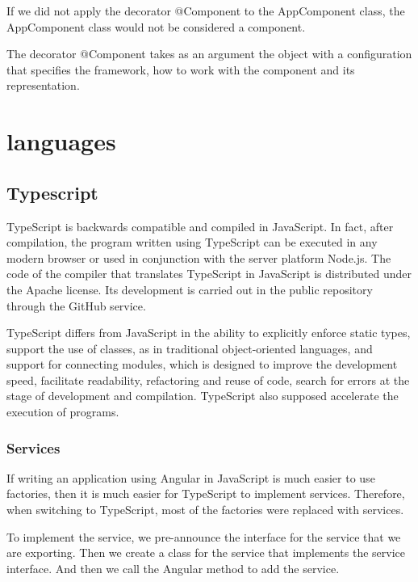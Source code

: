 If we did not apply the decorator @Component to the AppComponent class, the AppComponent class would not be considered a component.

The decorator @Component takes as an argument the object with a configuration that specifies the framework, how to work with the component and its representation. \cite{Angular}



\section{languages}

\subsection{Typescript}
TypeScript is backwards compatible and compiled in JavaScript. In fact, after compilation, the program written using TypeScript can be executed in any modern browser or used in conjunction with the server platform Node.js. The code of the compiler that translates TypeScript in JavaScript is distributed under the Apache license. Its development is carried out in the public repository through the GitHub service.\par
TypeScript differs from JavaScript in the ability to explicitly enforce static types, support the use of classes, as in traditional object-oriented languages, and support for connecting modules, which is designed to improve the development speed, facilitate readability, refactoring and reuse of code, search for errors at the stage of development and compilation. TypeScript also supposed accelerate the execution of programs. \cite{Typescript} \par

\subsubsection{Services}
If writing an application using Angular in JavaScript is much easier to use factories, then it is much easier for TypeScript to implement services. Therefore, when switching to TypeScript, most of the factories were replaced with services.\par
To implement the service, we pre-announce the interface for the service that we are exporting. Then we create a class for the service that implements the service interface. And then we call the Angular method to add the service. \cite{Typescript}

